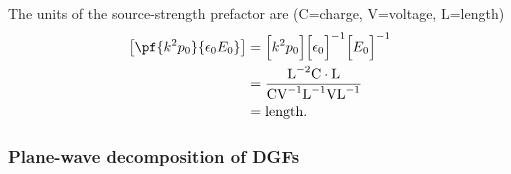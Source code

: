 \documentclass[letterpaper]{article}
\begin{document}
The units of the source-strength prefactor are
($\text{C}$=charge, $\text{V}$=voltage, $\text{L}$=length)
\begin{align*}
\left[\pf{k^2 p_0}{\epsilon_0 E_0}\right]
&= \Big[k^2 p_0\Big]\Big[\epsilon_0\Big]^{-1} \Big[E_0\Big]^{-1} 
\\
&= \frac{\text{L}^{-2} \text{C}\cdot \text{L}}
        {\text{C} \text{V}^{-1} \text{L}^{-1} \text{V} \text{L}^{-1}}
\\
&= \text{length}.
\end{align*}

\subsubsection{Plane-wave decomposition of DGFs}
\end{document}
